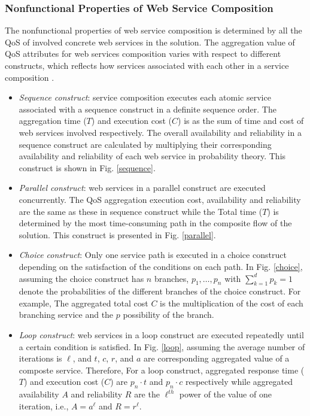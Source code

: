 \subsubsection{Nonfunctional Properties of Web Service Composition}
The nonfunctional properties of web service composition is determined by all the QoS of involved concrete web services in the solution. The aggregation value of QoS attributes for web services composition varies with respect to different constructs, which reflects how services associated with each other in a service composition \cite{zeng2003quality}.
\begin{itemize}

\item \emph{Sequence construct}: service composition executes each atomic service associated with a sequence construct in a definite sequence order. The aggregation time ($T$) and execution cost ($C$) is as the sum of time and cost of web services involved respectively. The overall availability and reliability in a sequence construct are calculated by multiplying their corresponding availability and reliability of each web service in probability theory. This construct is shown in Fig. \ref{sequence}.
\item \emph{Parallel construct}: web services in a parallel construct are executed concurrently. The QoS aggregation execution cost, availability and reliability are the same as these in sequence construct while the Total time ($T$) is determined by the most time-consuming path in the composite flow of the solution. This construct is presented in Fig. \ref{parallel}.
\item \emph{Choice construct}: Only one service path is executed in a choice construct depending on the satisfaction of the conditions on each path. In Fig. \ref{choice}, assuming the choice construct has $n$ branches, $p_1,\ldots, p_n$ with  $\sum\limits^d_{k=1}p_k=1$ denote the probabilities of the different branches of the choice construct. For example, The aggregated total cost $C$  is the multiplication of the cost of each branching service and the $p$ possibility of the branch.
\item \emph{Loop construct}: web services in a loop construct are executed repeatedly until a certain condition is satisfied. In Fig. \ref{loop}, assuming the average number of iterations is $\ell$, and $t$, $c$, $r$, and $a$ are corresponding aggregated value of a composte service. Therefore, For a loop construct, aggregated response time ($T$) and execution cost ($C$) are $p_n \cdot t$ and $p_n \cdot c$ respectively while aggregated availability $A$ and reliability $R$ are the $\ell^{th}$ power of the value of one iteration, i.e., $A=a^\ell$ and $R=r^\ell$.
\end{itemize}


